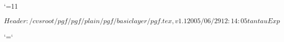 %

\edef\pgfatcode{\the\catcode`\@}
\catcode`\@=11



\ProvidesPackageRCS $Header: /cvsroot/pgf/pgf/plain/pgf/basiclayer/pgf.tex,v 1.1 2005/06/29 12:14:05 tantau Exp $






\catcode`\@=\pgfatcode

\endinput
